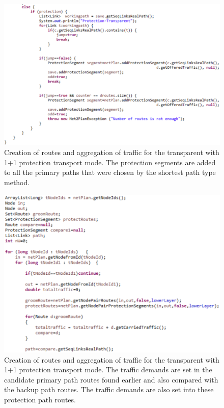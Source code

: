 \begin{figure}[H]
\centering
\includegraphics[width=14cm]{sdf/heuristic/transparent_protection/figures/grooming_transparent_protec2}
\caption{Creation of routes and aggregation of traffic for the transparent with 1+1 protection transport mode. The protection segments are added to all the primary paths that were chosen by the shortest path type method.}
\label{grooming_transparent_protec2}
\end{figure}

\begin{figure}[H]
\centering
\includegraphics[width=14cm]{sdf/heuristic/transparent_protection/figures/grooming_transparent_protec3}
\caption{Creation of routes and aggregation of traffic for the transparent with 1+1 protection transport mode. The traffic demands are set in the candidate primary path routes found earlier and also compared with the backup path routes. The traffic demands are also set into these protection path routes.}
\label{grooming_transparent_protec3}
\end{figure}

